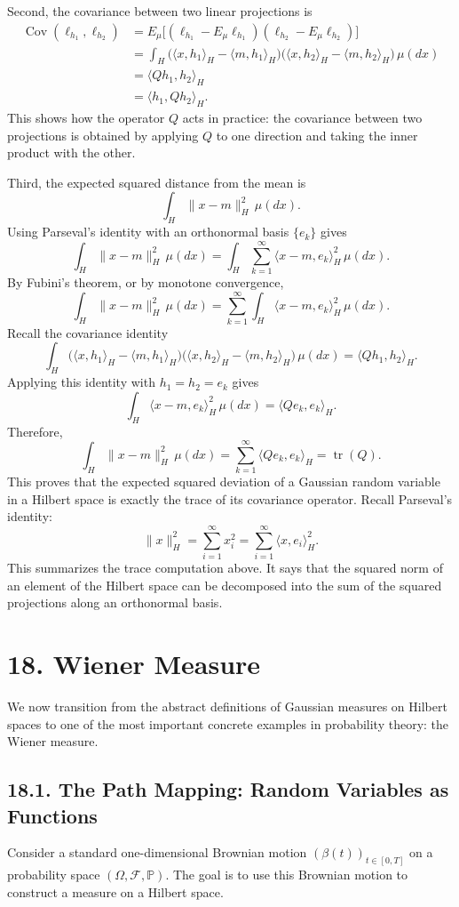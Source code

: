 \documentclass[11pt]{article}
\theoremstyle{definition}
\theoremstyle{remark}
\begin{document}
Second, the covariance between two linear projections is
\begin{align*}
\operatorname{Cov}(\ell_{h_1},\ell_{h_2})
&=
E_\mu\bigl[(\ell_{h_1}-E_\mu\ell_{h_1})(\ell_{h_2}-E_\mu\ell_{h_2})\bigr] \\
&=
\int_H
\bigl(\langle x,h_1\rangle_H-\langle m,h_1\rangle_H\bigr)
\bigl(\langle x,h_2\rangle_H-\langle m,h_2\rangle_H\bigr)\,\mu(dx) \\
&=
\langle Qh_1,h_2\rangle_H \\
&=
\langle h_1,Qh_2\rangle_H.
\end{align*}
This shows how the operator $Q$ acts in practice: the covariance between two projections is obtained by applying $Q$ to one direction and taking the inner product with the other.

Third, the expected squared distance from the mean is
\[
\int_H \|x-m\|_H^2\,\mu(dx).
\]
Using Parseval's identity with an orthonormal basis $\{e_k\}$ gives
\[
\int_H \|x-m\|_H^2\,\mu(dx)
=
\int_H \sum_{k=1}^{\infty}\langle x-m,e_k\rangle_H^2\,\mu(dx).
\]
By Fubini's theorem, or by monotone convergence,
\[
\int_H \|x-m\|_H^2\,\mu(dx)
=
\sum_{k=1}^{\infty}\int_H \langle x-m,e_k\rangle_H^2\,\mu(dx).
\]
Recall the covariance identity
\[
\int_H
\bigl(\langle x,h_1\rangle_H-\langle m,h_1\rangle_H\bigr)
\bigl(\langle x,h_2\rangle_H-\langle m,h_2\rangle_H\bigr)\,\mu(dx)
=
\langle Qh_1,h_2\rangle_H.
\]
Applying this identity with $h_1=h_2=e_k$ gives
\[
\int_H \langle x-m,e_k\rangle_H^2\,\mu(dx)=\langle Qe_k,e_k\rangle_H.
\]
Therefore,
\[
\int_H \|x-m\|_H^2\,\mu(dx)
=
\sum_{k=1}^{\infty}\langle Qe_k,e_k\rangle_H
=
\operatorname{tr}(Q).
\]
This proves that the expected squared deviation of a Gaussian random variable in a Hilbert space is exactly the trace of its covariance operator.
Recall Parseval's identity:
\[
\|x\|_H^2=\sum_{i=1}^{\infty}x_i^2=\sum_{i=1}^{\infty}\langle x,e_i\rangle_H^2.
\]
This summarizes the trace computation above. It says that the squared norm of an element of the Hilbert space can be decomposed into the sum of the squared projections along an orthonormal basis.

\section*{18. Wiener Measure}
We now transition from the abstract definitions of Gaussian measures on Hilbert spaces to one of the most important concrete examples in probability theory: the Wiener measure.

\subsection*{18.1. The Path Mapping: Random Variables as Functions}
Consider a standard one-dimensional Brownian motion $(\beta(t))_{t\in[0,T]}$ on a probability space $(\Omega,\mathcal F,\mathbb P)$. The goal is to use this Brownian motion to construct a measure on a Hilbert space.
\end{document}
